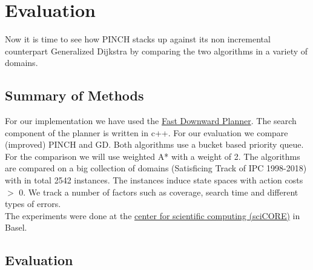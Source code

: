 \chapter{Evaluation}

Now it is time to see how PINCH stacks up against its non incremental counterpart Generalized Dijkstra by comparing the two algorithms in a variety of domains.

\section{Summary of Methods}
For our implementation we have used the \href{http://www.fast-downward.org/}{Fast Downward Planner}. The search component of the planner is written in c++. For our evaluation we compare (improved) PINCH and GD. Both algorithms use a bucket based priority queue.\\

For the comparison we will use weighted A* with a weight of 2. The algorithms are compared on a big collection of domains (Satisficing Track of IPC 1998-2018) with in total 2542 instances. The instances induce state spaces with action costs $>$ 0. We track a number of factors such as coverage, search time and different types of errors.\\

The experiments were done at the \href{https://scicore.unibas.ch/}{center for scientific computing (sciCORE)} in Basel. 

\newpage
\section{Evaluation}
